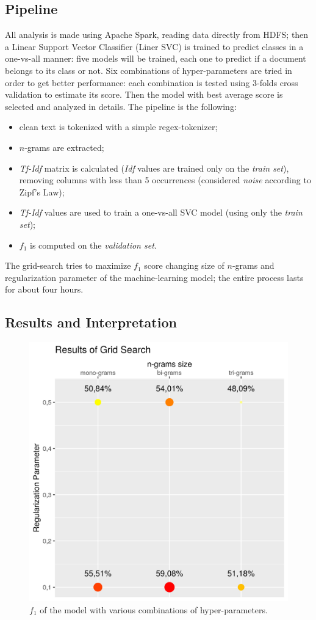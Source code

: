\documentclass[fleqn,10pt]{SelfArx}
\begin{document}
\subsection{Pipeline}
All analysis is made using Apache Spark, reading data directly from HDFS; then a Linear Support Vector Classifier (Liner SVC) is trained to predict classes in a one-vs-all manner: five models will be trained, each one to predict if a document belongs to its class or not.
Six combinations of hyper-parameters are tried in order to get better performance: each combination is tested using 3-folds cross validation to estimate its score.
Then the model with best average score is selected and analyzed in details.
The pipeline is the following:
\begin{itemize}[noitemsep]
\item clean text is tokenized with a simple regex-tokenizer;
\item $n$-grams are extracted;
\item \textit{Tf-Idf} matrix is calculated (\textit{Idf} values are trained only on the \textit{train set}), removing columns with less than 5 occurrences (considered \textit{noise} according to Zipf's Law);
\item \textit{Tf-Idf} values are used to train a one-vs-all SVC model (using only the \textit{train set});
\item $f_1$ is computed on the \textit{validation set}.
\end{itemize}
The grid-search tries to maximize $f_1$ score changing size of $n$-grams and regularization parameter of the machine-learning model; the entire process lasts for about four hours.

\subsection{Results and Interpretation}
\begin{figure}[!h]
  \center
  \includegraphics[width=0.8\linewidth]{multi_class_grid_search.png}
  \caption{$f_1$ of the model with various combinations of hyper-parameters.}
  \label{fig:grid_search_multilabel}
\end{figure}
\end{document}
